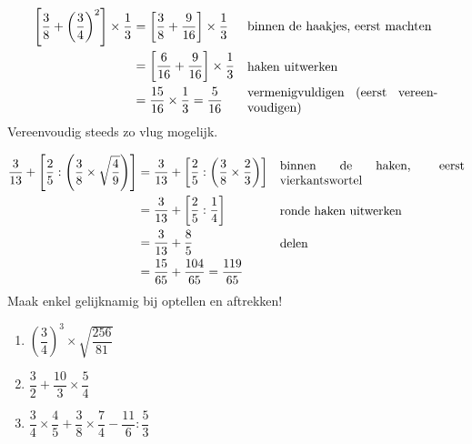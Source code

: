 \documentclass{bis}
\begin{document}
\begin{voorbeeld}
\begin{align*}
  \left[\dfrac{3}{8}+\left(\dfrac{3}{4}\right)^2\right]\times\dfrac{1}{3} &= \left[\dfrac{3}{8}+\dfrac{9}{16}\right]\times\dfrac{1}{3} & \parbox{15em}{binnen de haakjes, eerst machten}\\
                                                                          &= \left[\dfrac{6}{16}+\dfrac{9}{16}\right]\times\dfrac{1}{3} & \parbox{15em}{haken uitwerken}\\
                                                                          &= \dfrac{15}{16}\times\dfrac{1}{3}=\dfrac{5}{16} & \parbox{15em}{vermenigvuldigen (eerst vereenvoudigen)}
\end{align*}
Vereenvoudig steeds zo vlug mogelijk.
\end{voorbeeld}

\begin{voorbeeld}
\begin{align*}
  \dfrac{3}{13}+\left[\dfrac{2}{5}:\left(\dfrac{3}{8}\times\sqrt{\dfrac{4}{9}}\right)\right] &= \dfrac{3}{13}+\left[\dfrac{2}{5}:\left(\dfrac{3}{8}\times\dfrac{2}{3}\right)\right] & \parbox{15em}{binnen de haken, eerst vierkantswortel}\\
                                                                                              &= \dfrac{3}{13}+\left[\dfrac{2}{5}:\dfrac{1}{4}\right] & \parbox{15em}{ronde haken uitwerken}\\
                                                                                              &= \dfrac{3}{13}+\dfrac{8}{5} & \parbox{15em}{delen}\\
                                                                                              &= \dfrac{15}{65}+\dfrac{104}{65}=\dfrac{119}{65}
\end{align*}
Maak enkel gelijknamig bij optellen en aftrekken!
\end{voorbeeld}

\begin{exercise}
\begin{enumerate}
  \item $\left(\dfrac{3}{4}\right)^3\times\sqrt{\dfrac{256}{81}}$
  \item $\dfrac{3}{2}+\dfrac{10}{3}\times\dfrac{5}{4}$
  \item $\dfrac{3}{4}\times\dfrac{4}{5}+\dfrac{3}{8}\times\dfrac{7}{4}-\dfrac{11}{6}:\dfrac{5}{3}$
\end{enumerate}
\end{exercise}
\end{document}
